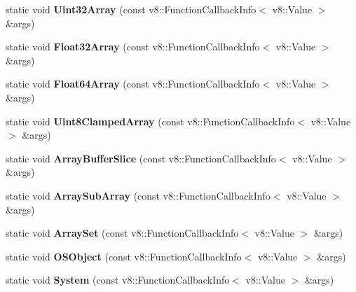 \begin{DoxyCompactItemize}
\item 
\hypertarget{classv8_1_1_shell_a81f79618e0c5a508238b5fb96047f8cd}{}static void {\bfseries Uint32\+Array} (const v8\+::\+Function\+Callback\+Info$<$ v8\+::\+Value $>$ \&args)\label{classv8_1_1_shell_a81f79618e0c5a508238b5fb96047f8cd}

\item 
\hypertarget{classv8_1_1_shell_adb9310f37fe5169775adf0cb36a01dd8}{}static void {\bfseries Float32\+Array} (const v8\+::\+Function\+Callback\+Info$<$ v8\+::\+Value $>$ \&args)\label{classv8_1_1_shell_adb9310f37fe5169775adf0cb36a01dd8}

\item 
\hypertarget{classv8_1_1_shell_a83cb0715017ec2943e36538ba73015be}{}static void {\bfseries Float64\+Array} (const v8\+::\+Function\+Callback\+Info$<$ v8\+::\+Value $>$ \&args)\label{classv8_1_1_shell_a83cb0715017ec2943e36538ba73015be}

\item 
\hypertarget{classv8_1_1_shell_ac785b997b3bb8adced2543d0a92c8165}{}static void {\bfseries Uint8\+Clamped\+Array} (const v8\+::\+Function\+Callback\+Info$<$ v8\+::\+Value $>$ \&args)\label{classv8_1_1_shell_ac785b997b3bb8adced2543d0a92c8165}

\item 
\hypertarget{classv8_1_1_shell_a910ef753e9bc9f992571f3fac2370cbb}{}static void {\bfseries Array\+Buffer\+Slice} (const v8\+::\+Function\+Callback\+Info$<$ v8\+::\+Value $>$ \&args)\label{classv8_1_1_shell_a910ef753e9bc9f992571f3fac2370cbb}

\item 
\hypertarget{classv8_1_1_shell_ad0d33a54125dc5da5949a9a43ce6df4e}{}static void {\bfseries Array\+Sub\+Array} (const v8\+::\+Function\+Callback\+Info$<$ v8\+::\+Value $>$ \&args)\label{classv8_1_1_shell_ad0d33a54125dc5da5949a9a43ce6df4e}

\item 
\hypertarget{classv8_1_1_shell_a282d0c8b7040e7668ca06e64ba2de7d4}{}static void {\bfseries Array\+Set} (const v8\+::\+Function\+Callback\+Info$<$ v8\+::\+Value $>$ \&args)\label{classv8_1_1_shell_a282d0c8b7040e7668ca06e64ba2de7d4}

\item 
\hypertarget{classv8_1_1_shell_af86fe7b573f60b12594d0458cd40ef7a}{}static void {\bfseries O\+S\+Object} (const v8\+::\+Function\+Callback\+Info$<$ v8\+::\+Value $>$ \&args)\label{classv8_1_1_shell_af86fe7b573f60b12594d0458cd40ef7a}

\item 
\hypertarget{classv8_1_1_shell_ae09de0795a893adba7512629563cc340}{}static void {\bfseries System} (const v8\+::\+Function\+Callback\+Info$<$ v8\+::\+Value $>$ \&args)\label{classv8_1_1_shell_ae09de0795a893adba7512629563cc340}


\end{DoxyCompactItemize}
